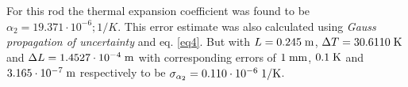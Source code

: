 \FloatBarrier
For this rod the thermal expansion coefficient was found to be $\alpha_2 = 19.371 \cdot 10^{-6}; 1/K$.
This error estimate was also calculated using \emph{Gauss propagation of uncertainty} and eq. \eqref{eq4}. But with
$L=0.245 \; \rm{m}$, $\Delta T = 30.6110 \; \rm{K}$ and $\Delta L =  1.4527 \cdot 10^{-4} \; \rm{m}$ with corresponding errors of $1 \; \rm{mm}$, $0.1 \; \rm{K}$ and $3.165 \cdot 10^{-7} \; \rm{m}$ respectively  to be $\sigma_{\alpha_2} =  0.110 \cdot 10^{-6} \; \rm{1/K}$.


